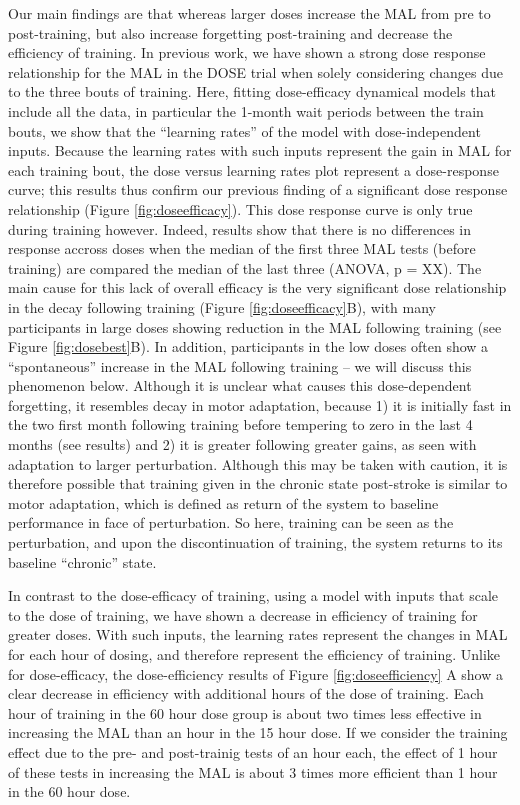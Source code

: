 Our main findings are that whereas larger doses increase the MAL from pre to post-training, but also increase forgetting post-training and decrease the efficiency of training. 
In previous work, we have shown a strong dose response relationship for the MAL in the DOSE trial when solely considering changes due to the three bouts of training. 
Here, fitting dose-efficacy dynamical models that include all the data, in particular the 1-month wait periods between the train bouts, we show that the “learning rates” of the model with dose-independent inputs. 
Because the learning rates with such inputs represent the gain in MAL for each training bout, the dose versus learning rates plot represent a dose-response curve; this results thus confirm our previous finding of a significant dose response relationship (Figure \ref{fig:doseefficacy}). 
This dose response curve is only true during training however. 
Indeed, results show that there is no differences in response accross doses when the median of the first three MAL tests (before training) are compared the median of the last three (ANOVA, p = XX). 
The main cause for this lack of overall efficacy is the very significant dose relationship in the decay following training (Figure \ref{fig:doseefficacy}B), with many participants in large doses showing reduction in the MAL following training (see Figure \ref{fig:dosebest}B). 
In addition, participants in the low doses often show a “spontaneous” increase in the MAL following training – we will discuss this phenomenon below. 
Although it is unclear  what causes this dose-dependent forgetting, it resembles decay in motor adaptation, because 1) it is initially fast in the two first month following training before tempering to zero in the last 4 months (see results) and 2) it is greater following greater gains, as seen with adaptation to larger perturbation. 
Although this may be taken with caution, it is therefore possible that training given in the chronic state post-stroke is similar to motor adaptation, which is defined as return of the system to baseline performance in face of perturbation. 
So here, training can be seen as the perturbation, and upon the discontinuation of training, the system returns to its baseline “chronic” state. 

In contrast to the dose-efficacy of training, using a model with inputs that scale to the dose of training, we have shown a decrease in efficiency of training for greater doses. 
With such inputs, the learning rates represent the changes in MAL for each hour of dosing, and therefore represent the efficiency of training. 
Unlike for dose-efficacy, the dose-efficiency results of Figure \ref{fig:doseefficiency} A show a clear decrease in efficiency with additional hours of the dose of training. 
Each hour of training in the 60 hour dose group is about two times less effective in increasing the MAL than an hour in the 15 hour dose. 
If we consider the training effect due to the pre- and post-trainig tests of an hour each, the effect of 1 hour of these tests in increasing the MAL is about 3 times more efficient than 1 hour in the 60 hour dose. 

